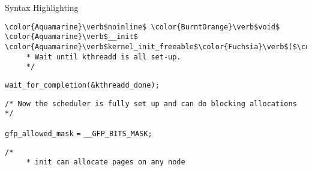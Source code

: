 \begin{frame}{Syntax Highlighting}
\begin{verbatim}
\color{Aquamarine}\verb$noinline$ \color{BurntOrange}\verb$void$ \color{Aquamarine}\verb$__init$ \color{Aquamarine}\verb$kernel_init_freeable$\color{Fuchsia}\verb$($\color{BurntOrange}\verb$void$\color{Fuchsia}\verb$)$\newline\color{Fuchsia}\verb${$\newline\tab\color{Rhodamine}\begin{verbatim}/*
	 * Wait until kthreadd is all set-up.
	 */\end{verbatim}\leavevmode\newline\tab\color{Aquamarine}\verb$wait_for_completion$\color{Fuchsia}\verb$($\color{Goldenrod}\verb$&$\color{Aquamarine}\verb$kthreadd_done$\color{Fuchsia}\verb$)$\color{Fuchsia}\verb$;$\newline\newline\tab\color{Rhodamine}\begin{verbatim}/* Now the scheduler is fully set up and can do blocking allocations */\end{verbatim}\leavevmode\newline\tab\color{Aquamarine}\verb$gfp_allowed_mask$ \color{Fuchsia}\verb$=$ \color{Aquamarine}\verb$__GFP_BITS_MASK$\color{Fuchsia}\verb$;$\newline\newline\tab\color{Rhodamine}\begin{verbatim}/*
	 * init can allocate pages on any node

\end{verbatim}
\end{frame}
